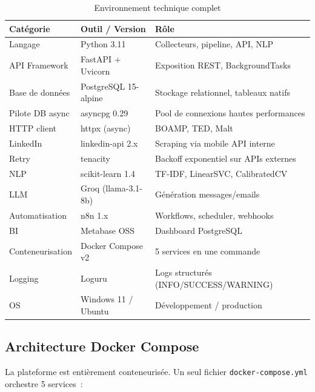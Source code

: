 \begin{table}[H]
  \centering
  \begin{tabular}{L{3cm} L{4cm} L{6cm}}
    \toprule
    \textbf{Catégorie} & \textbf{Outil / Version} & \textbf{Rôle} \\
    \midrule
    Langage & Python 3.11 & Collecteurs, pipeline, API, NLP \\
    API Framework & FastAPI + Uvicorn & Exposition REST, BackgroundTasks \\
    Base de données & PostgreSQL 15-alpine & Stockage relationnel, tableaux natifs \\
    Pilote DB async & asyncpg 0.29 & Pool de connexions hautes performances \\
    HTTP client & httpx (async) & BOAMP, TED, Malt \\
    LinkedIn & linkedin-api 2.x & Scraping via mobile API interne \\
    Retry & tenacity & Backoff exponentiel sur APIs externes \\
    NLP & scikit-learn 1.4 & TF-IDF, LinearSVC, CalibratedCV \\
    LLM & Groq (llama-3.1-8b) & Génération messages/emails \\
    Automatisation & n8n 1.x & Workflows, scheduler, webhooks \\
    BI & Metabase OSS & Dashboard PostgreSQL \\
    Conteneurisation & Docker Compose v2 & 5 services en une commande \\
    Logging & Loguru & Logs structurés (INFO/SUCCESS/WARNING) \\
    OS & Windows 11 / Ubuntu & Développement / production \\
    \bottomrule
  \end{tabular}
  \caption{Environnement technique complet}
  \label{tab:env}
\end{table}

\subsection{Architecture Docker Compose}

La plateforme est entièrement conteneurisée. Un seul fichier
\texttt{docker-compose.yml} orchestre 5 services~:

